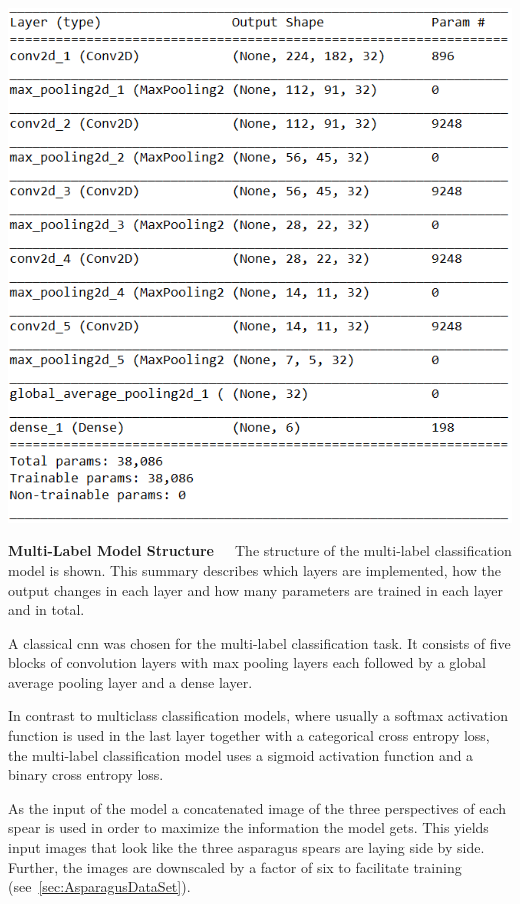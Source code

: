 \begin{table}[!htb]
	\centering
	\includegraphics[scale=0.8]{Figures/chapter04/multilabel_structure.png}
	\decoRule
	\caption[Multi-Label Model Structure]{\textbf{Multi-Label Model Structure}~~~The structure of the multi-label classification model is shown. This summary describes which layers are implemented, how the output changes in each layer and how many parameters are trained in each layer and in total.}
	\label{tab:MultilabelStructure}
\end{table}

\bigskip
A classical \acrshort{cnn} was chosen for the multi-label classification task. It consists of five blocks of convolution layers with max pooling layers each followed by a global average pooling layer and a dense layer.

In contrast to multiclass classification models, where usually a softmax activation function is used in the last layer together with a categorical cross entropy loss, the multi-label classification model uses a sigmoid activation function and a binary cross entropy loss.

As the input of the model a concatenated image of the three perspectives of each spear is used in order to maximize the information the model gets. This yields input images that look like the three asparagus spears are laying side by side. Further, the images are downscaled by a factor of six to facilitate training (see~\autoref{sec:AsparagusDataSet}).


